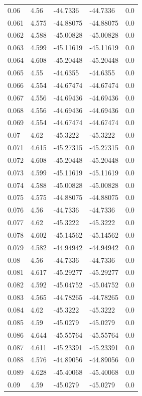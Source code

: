 \begin{tabular}{lllll}
0.06 & 4.56 & -44.7336 & -44.7336 & 0.0 \\
0.061 & 4.575 & -44.88075 & -44.88075 & 0.0 \\
0.062 & 4.588 & -45.00828 & -45.00828 & 0.0 \\
0.063 & 4.599 & -45.11619 & -45.11619 & 0.0 \\
0.064 & 4.608 & -45.20448 & -45.20448 & 0.0 \\
0.065 & 4.55 & -44.6355 & -44.6355 & 0.0 \\
0.066 & 4.554 & -44.67474 & -44.67474 & 0.0 \\
0.067 & 4.556 & -44.69436 & -44.69436 & 0.0 \\
0.068 & 4.556 & -44.69436 & -44.69436 & 0.0 \\
0.069 & 4.554 & -44.67474 & -44.67474 & 0.0 \\
0.07 & 4.62 & -45.3222 & -45.3222 & 0.0 \\
0.071 & 4.615 & -45.27315 & -45.27315 & 0.0 \\
0.072 & 4.608 & -45.20448 & -45.20448 & 0.0 \\
0.073 & 4.599 & -45.11619 & -45.11619 & 0.0 \\
0.074 & 4.588 & -45.00828 & -45.00828 & 0.0 \\
0.075 & 4.575 & -44.88075 & -44.88075 & 0.0 \\
0.076 & 4.56 & -44.7336 & -44.7336 & 0.0 \\
0.077 & 4.62 & -45.3222 & -45.3222 & 0.0 \\
0.078 & 4.602 & -45.14562 & -45.14562 & 0.0 \\
0.079 & 4.582 & -44.94942 & -44.94942 & 0.0 \\
0.08 & 4.56 & -44.7336 & -44.7336 & 0.0 \\
0.081 & 4.617 & -45.29277 & -45.29277 & 0.0 \\
0.082 & 4.592 & -45.04752 & -45.04752 & 0.0 \\
0.083 & 4.565 & -44.78265 & -44.78265 & 0.0 \\
0.084 & 4.62 & -45.3222 & -45.3222 & 0.0 \\
0.085 & 4.59 & -45.0279 & -45.0279 & 0.0 \\
0.086 & 4.644 & -45.55764 & -45.55764 & 0.0 \\
0.087 & 4.611 & -45.23391 & -45.23391 & 0.0 \\
0.088 & 4.576 & -44.89056 & -44.89056 & 0.0 \\
0.089 & 4.628 & -45.40068 & -45.40068 & 0.0 \\
0.09 & 4.59 & -45.0279 & -45.0279 & 0.0 \\

\end{tabular}
